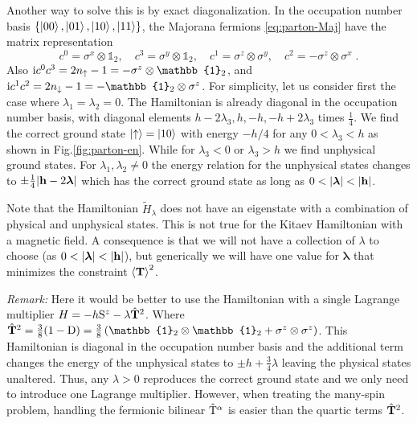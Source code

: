Another way to solve this is by exact diagonalization. In the occupation number   basis $\{\ket{00},\ket{01},\ket{10},\ket{11}\}$, the Majorana fermions \eqref{eq:parton-Maj} have the matrix representation
\begin{equation}
    c^0 = \sigma^x \otimes \mathbb{1}_2, \quad
    c^3 = \sigma^y \otimes \mathbb{1}_2, \quad
    c^1 =  \sigma^z \otimes \sigma^y, \quad
    c^2 = - \sigma^z \otimes \sigma^x \; .
\end{equation}
Also $\im c^0 c^3 = 2 n_\uparrow - 1 = - \sigma^z \otimes \mathbb{1}_2$, and  $\im c^1 c^2 = 2 n_\downarrow - 1 = - \mathbb{1}_2 \otimes \sigma^z$.
For simplicity, let us consider first the case where $\lambda_1=\lambda_2=0$. The Hamiltonian is already diagonal in the occupation number basis, with diagonal elements $h-2\lambda_3,h,-h, -h + 2\lambda_3 $ times $\frac14$.  We find the correct ground state $\ket{\uparrow}=\ket{10}$ with energy $-h/4$ for any $0<\lambda_3<h$ as shown in Fig.\ref{fig:parton-en}. While for $\lambda_3<0$ or $\lambda_3> h$ we find unphysical ground states. For $\lambda_1,\lambda_2\neq 0$ the energy relation for the unphysical states changes to $\pm\frac14 | \mathbf{h}- 2\bm{\lambda}|$  %
which has the correct ground state as long as $0<|\bm\lambda|<|\mb h|$.

Note that the Hamiltonian $\tilde{H}_\lambda$ does not have an eigenstate with a combination of physical and unphysical states. This is not true for the Kitaev Hamiltonian with a magnetic field. A consequence is that we will not have a collection of $\lambda$ to choose (as $0<|\bm\lambda|<|\mb h|$), but generically we will have one value for $\bm{\lambda}$ that minimizes the constraint $\braket{\mathbf{T}}^2$.

\textit{Remark:} Here it would be better to use the Hamiltonian with a single Lagrange multiplier $H = - h \mathrm{S}^z - \lambda \hat{\mathbf{T}}^2 $.
Where $\hat{\mb{T}}^2=\frac{3}{8}(1-\rmD) = \frac{3}{8}\left( \mathbb{1}_2\otimes\mathbb{1}_2 + \sigma^z \otimes \sigma^z \right)$.
This Hamiltonian is diagonal in the occupation number basis and the additional term changes the energy of the unphysical states to $\pm h +  \frac34 \lambda$ leaving the physical states unaltered. Thus, any $\lambda > 0$ reproduces the correct ground state and we only need to introduce one Lagrange multiplier. However, when treating the many-spin problem, handling the fermionic bilinear $\hat{\mathrm{T}}^\alpha$ is easier than the quartic terms $\hat{\mathbf{T}}^2$. %


